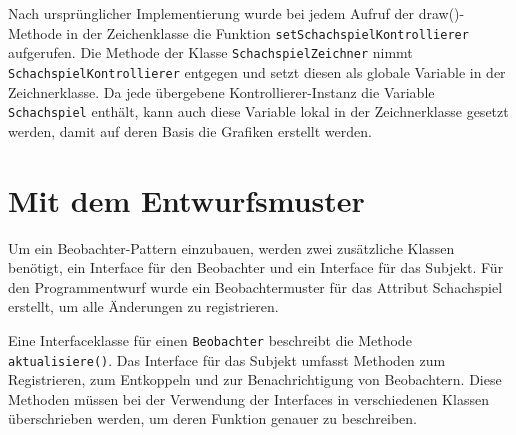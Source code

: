 Nach ursprünglicher Implementierung wurde bei jedem Aufruf der draw()-Methode in der Zeichenklasse die Funktion \texttt{setSchachspielKontrollierer} aufgerufen.
Die Methode der Klasse \texttt{SchachspielZeichner} nimmt \texttt{SchachspielKontrollierer} entgegen und setzt diesen als globale Variable in der Zeichnerklasse. 
Da jede übergebene Kontrollierer-Instanz die Variable \texttt{Schachspiel} enthält, kann auch diese Variable lokal in der Zeichnerklasse gesetzt werden, damit auf deren Basis die Grafiken erstellt werden.

\newpage

\section{Mit dem Entwurfsmuster}

Um ein Beobachter-Pattern einzubauen, werden zwei zusätzliche Klassen benötigt, ein Interface für den Beobachter und ein Interface für das Subjekt.
Für den Programmentwurf wurde ein Beobachtermuster für das Attribut Schachspiel erstellt, um alle Änderungen zu registrieren.

Eine Interfaceklasse für einen \texttt{Beobachter} beschreibt die Methode \texttt{aktualisiere()}.
Das Interface für das Subjekt umfasst Methoden zum Registrieren, zum Entkoppeln und zur Benachrichtigung von Beobachtern. 
Diese Methoden müssen bei der Verwendung der Interfaces in verschiedenen Klassen überschrieben werden, um deren Funktion genauer zu beschreiben. 

